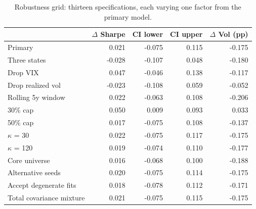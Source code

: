 \begin{table}[htbp]
\caption{Robustness grid: thirteen specifications, each varying one factor from the primary model.}
\label{tab:table4_robustness_grid}
\small
\begin{tabular}{lrrrr}
\toprule
 & $\Delta$ Sharpe & CI lower & CI upper & $\Delta$ Vol (pp) \\
\midrule
Primary & 0.021 & -0.075 & 0.115 & -0.175 \\
Three states & -0.028 & -0.107 & 0.048 & -0.180 \\
Drop VIX & 0.047 & -0.046 & 0.138 & -0.117 \\
Drop realized vol & -0.023 & -0.108 & 0.059 & -0.052 \\
Rolling 5y window & 0.022 & -0.063 & 0.108 & -0.206 \\
30\% cap & 0.050 & 0.009 & 0.093 & 0.033 \\
50\% cap & 0.017 & -0.075 & 0.108 & -0.137 \\
$\kappa$ = 30 & 0.022 & -0.075 & 0.117 & -0.175 \\
$\kappa$ = 120 & 0.019 & -0.074 & 0.110 & -0.177 \\
Core universe & 0.016 & -0.068 & 0.100 & -0.188 \\
Alternative seeds & 0.020 & -0.075 & 0.114 & -0.175 \\
Accept degenerate fits & 0.018 & -0.078 & 0.112 & -0.171 \\
Total covariance mixture & 0.021 & -0.075 & 0.115 & -0.175 \\
\bottomrule
\end{tabular}
\end{table}
